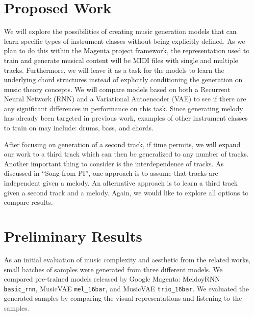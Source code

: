 \documentclass{article}
\begin{document}
\section{Proposed Work}
We will explore the possibilities of creating music generation models that can learn specific types of instrument classes without being explicitly defined. As we plan to do this within the Magenta project framework, the representation used to train and generate musical content will be MIDI files with single and multiple tracks. Furthermore, we will leave it as a task for the models to learn the underlying chord structures instead of explicitly conditioning the generation on music theory concepts. We will compare models based on both a Recurrent Neural Network (RNN) and a Variational Autoencoder (VAE) to see if there are any significant differences in performance on this task. Since generating melody has already been targeted in previous work, examples of other instrument classes to train on may include: drums, bass, and chords.

After focusing on generation of a second track, if time permits, we will expand our work to a third track which can then be generalized to any number of tracks. Another important thing to consider is the interdependence of tracks. As discussed in ``Song from PI'', one approach is to assume that tracks are independent given a melody. An alternative approach is to learn a third track given a second track and a melody. Again, we would like to explore all options to compare results.


\section{Preliminary Results}

As an initial evaluation of music complexity and aesthetic from the related works, small batches of samples were generated from three different models. We compared pre-trained models released by Google Magenta: MeldoyRNN \verb|basic_rnn|, MusicVAE \verb|mel_16bar|, and MusicVAE \verb|trio_16bar|. We evaluated the generated samples by comparing the visual representations and listening to the samples.
\end{document}
